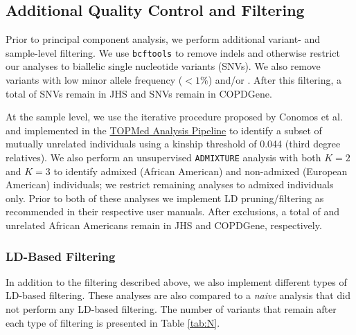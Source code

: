\documentclass[12pt]{article}
\newcommand{\edit}[1]{{\color{red}{#1}}}
\newcommand{\add}[1]{{\color{red}{[... #1 ...]}}}
\begin{document}
\subsection{Additional Quality Control and Filtering}
\label{sec:filter}

Prior to principal component analysis, we perform additional variant- and sample-level filtering.
We use \texttt{bcftools} \citep{bcftools} to remove indels and otherwise restrict our analyses to biallelic single nucleotide variants (SNVs). 
We also remove variants with low minor allele frequency ($< 1\%$) and/or \edit{high rates of missing calls ($>1\%$) --- STILL NEEDS TO BE IMPLEMENTED}.
After this filtering, a total of \edit{???} SNVs remain in JHS and \edit{???} SNVs remain in COPDGene.

At the sample level, we use the iterative procedure proposed by Conomos et al. \citep{conomos2016related} and implemented in the \href{https://github.com/UW-GAC/analysis_pipeline}{TOPMed Analysis Pipeline} to identify a subset of mutually unrelated individuals using a kinship threshold of 0.044 (third degree relatives).
We also perform an unsupervised \texttt{ADMIXTURE} \citep{admixture} analysis with both $K = 2$ and $K = 3$ to identify admixed (African American) and non-admixed (European American) individuals; we restrict remaining analyses to admixed individuals only.
Prior to both of these analyses we implement LD pruning/filtering as recommended in their respective user manuals.
After exclusions, a total of \edit{???} and \edit{???} unrelated African Americans remain in JHS and COPDGene, respectively.

\subsubsection{LD-Based Filtering}
In addition to the filtering described above, we also implement different types of LD-based filtering.
\add{Describe the different types of LD-based filtering we compared (see below).}
These analyses are also compared to a \textit{naive} analysis that did not perform any LD-based filtering.
The number of variants that remain after each type of filtering is presented in Table \ref{tab:N}.
\end{document}
